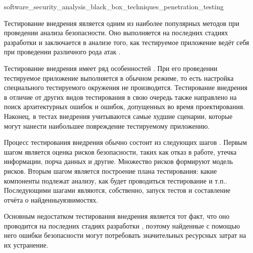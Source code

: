 
	{software_security_analysis_black_box_techniques_penetration_testing}

%
Тестирование внедрения является одним из наиболее популярных методов при проведении анализа безопасности. 
%
Оно выполняется на последних стадиях разработки  и заключается в анализе того, как тестируемое приложение ведёт себя при проведении различного рода атак .

%
Тестирование внедрения имеет ряд особенностей . 
%
При его проведении тестируемое приложение выполняется в обычном режиме, то есть настройка специального тестируемого окружения не производится. 
%
Тестирование внедрения в отличие от других видов тестирования в свою очередь также направлено на поиск архитектурных ошибок и ошибок, допущенных во время проектирования. 
%
Наконец, в тестах внедрения учитываются самые худшие сценарии, которые могут нанести наибольшее повреждение тестируемому приложению.

%
Процесс тестирования внедрения обычно состоит из следующих шагов . 
%
Первым шагом является оценка рисков безопасности, таких как отказ в работе, утечка информации, порча данных и другие. 
%
Множество рисков формируют модель рисков. 
%
Вторым шагом является построение плана тестирования: какие компоненты подлежат анализу, как будет проводиться тестирование и т.п.. 
%
Последующими шагами являются, собственно, запуск тестов и составление отчёта о найденныуязвимостях.

%
Основным недостатком тестирования внедрения является тот факт, что оно проводится на последних стадиях разработки , поэтому найденные с помощью него ошибки безопасности могут потребовать значительных ресурсных затрат на их устранение.